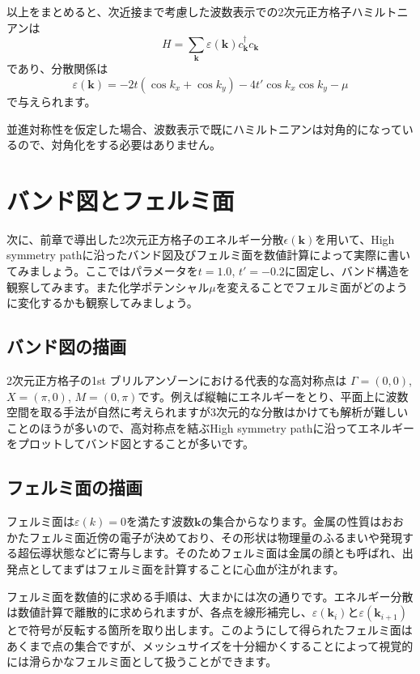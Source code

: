 \documentclass[12pt]{jreport}
\begin{document}
以上をまとめると、次近接まで考慮した波数表示での2次元正方格子ハミルトニアンは
\begin{equation}
H
=
\sum_{\bm{k}}
\varepsilon(\bm{k})
c_{\bm{k}}^\dagger c_{\bm{k}}
\end{equation}
であり、分散関係は
\begin{equation}
\varepsilon(\bm{k})
=
-2t(\cos k_x + \cos k_y)
-4t' \cos k_x \cos k_y
- \mu
\end{equation}
で与えられます。

並進対称性を仮定した場合、波数表示で既にハミルトニアンは対角的になっているので、対角化をする必要はありません。

\section{バンド図とフェルミ面}

次に、前章で導出した2次元正方格子のエネルギー分散$\epsilon(\bm{k})$を用いて、High symmetry pathに沿ったバンド図及びフェルミ面を数値計算によって実際に書いてみましょう。ここではパラメータを$t = 1.0$, $t' = -0.2$に固定し、バンド構造を観察してみます。また化学ポテンシャル$\mu$を変えることでフェルミ面がどのように変化するかも観察してみましょう。

\subsection{バンド図の描画}
2次元正方格子の1st ブリルアンゾーンにおける代表的な高対称点は
$\Gamma = (0,0)$, $X = (\pi,0)$, $M = (0, \pi)$です。例えば縦軸にエネルギーをとり、平面上に波数空間を取る手法が自然に考えられますが3次元的な分散はかけても解析が難しいことのほうが多いので、高対称点を結ぶHigh symmetry pathに沿ってエネルギーをプロットしてバンド図とすることが多いです。

\subsection{フェルミ面の描画}
フェルミ面は$\varepsilon(k) = 0$を満たす波数$\bm{k}$の集合からなります。金属の性質はおおかたフェルミ面近傍の電子が決めており、その形状は物理量のふるまいや発現する超伝導状態などに寄与します。そのためフェルミ面は金属の顔とも呼ばれ、出発点としてまずはフェルミ面を計算することに心血が注がれます。

フェルミ面を数値的に求める手順は、大まかには次の通りです。エネルギー分散は数値計算で離散的に求められますが、各点を線形補完し、$\varepsilon(\bm{k}_i)$と$\varepsilon(\bm{k}_{i+1})$とで符号が反転する箇所を取り出します。このようにして得られたフェルミ面はあくまで点の集合ですが、メッシュサイズを十分細かくすることによって視覚的には滑らかなフェルミ面として扱うことができます。
\end{document}
